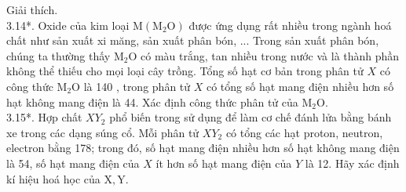 \documentclass[10pt]{article}
\begin{document}
Giải thích.\\
3.14*. Oxide của kim loại $\mathrm{M}\left(\mathrm{M}_{2} \mathrm{O}\right)$ được ứng dụng rất nhiều trong ngành hoá chất như sản xuất xi măng, sản xuất phân bón, ... Trong sản xuất phân bón, chúng ta thường thấy $\mathrm{M}_{2} \mathrm{O}$ có màu trắng, tan nhiều trong nước và là thành phần không thể thiếu cho mọi loại cây trồng. Tổng số hạt cơ bản trong phân tử $X$ có công thức $\mathrm{M}_{2} \mathrm{O}$ là 140 , trong phân tử $X$ có tổng số hạt mang điện nhiều hơn số hạt không mang điện là 44. Xác định công thức phân tử của $\mathrm{M}_{2} \mathrm{O}$.\\
3.15*. Hợp chất $X Y_{2}$ phổ biến trong sử dụng để làm cơ chế đánh lửa bằng bánh xe trong các dạng súng cổ. Mỗi phân tử $X Y_{2}$ có tổng các hạt proton, neutron, electron bằng 178; trong đó, số hạt mang điện nhiều hơn số hạt không mang điện là 54, số hạt mang điện của $X$ ít hơn số hạt mang điện của $Y$ là 12. Hãy xác định kí hiệu hoá học của $\mathrm{X}, \mathrm{Y}$.
\end{document}
